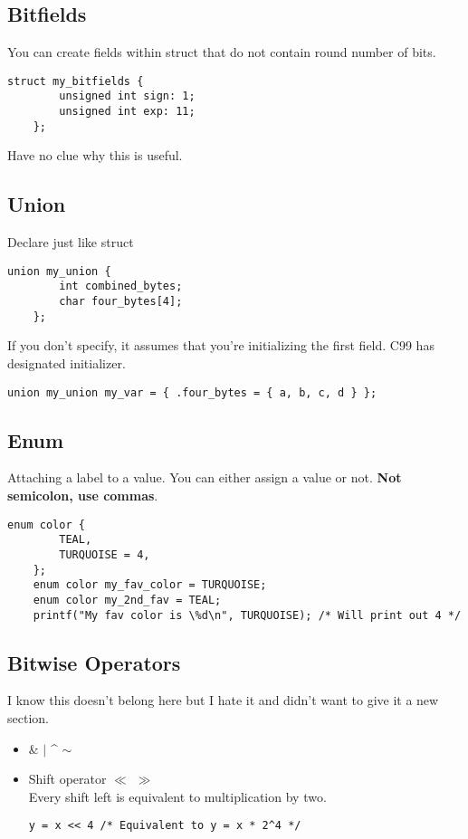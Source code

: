 \documentclass{article}
\begin{document}
\subsection{Bitfields}
You can create fields within struct that do not contain round number of bits.
\begin{lstlisting}[style=CStyle]
    struct my_bitfields {
        unsigned int sign: 1;
        unsigned int exp: 11;
    };
\end{lstlisting}
Have no clue why this is useful.

\subsection{Union}
Declare just like struct
\begin{lstlisting}[style=CStyle]
    union my_union {
        int combined_bytes;
        char four_bytes[4];
    };
\end{lstlisting}
If you don't specify, it assumes that you're initializing the first field. C99 has designated initializer. 
\begin{lstlisting}[style=CStyle]
    union my_union my_var = { .four_bytes = { a, b, c, d } };
\end{lstlisting}

\subsection{Enum}
Attaching a label to a value. You can either assign a value or not. \textbf{Not semicolon, use commas}.
\begin{lstlisting}[style=CStyle]
    enum color {
        TEAL,
        TURQUOISE = 4,
    };
    enum color my_fav_color = TURQUOISE;
    enum color my_2nd_fav = TEAL;
    printf("My fav color is \%d\n", TURQUOISE); /* Will print out 4 */
\end{lstlisting}

\subsection{Bitwise Operators}
I know this doesn't belong here but I hate it and didn't want to give it a new section.
\begin{itemize}
    \item \& $\mid$ \^{} $\sim$
    \item Shift operator $\ll$ $\gg$\\
    Every shift left is equivalent to multiplication by two.
    \begin{lstlisting}[style=CStyle]
        y = x << 4 /* Equivalent to y = x * 2^4 */
    \end{lstlisting}
\end{itemize}
\end{document}
